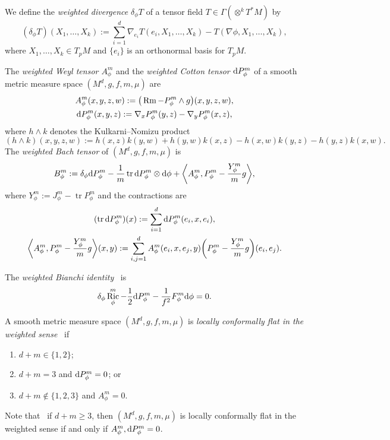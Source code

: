 \documentclass[10pt,a4paper]{amsart}
\DeclareMathOperator{\tr}{tr}
\DeclareMathOperator{\Ric}{Ric}
\DeclareMathOperator{\Rm}{Rm}
\newcommand{\lp}{\langle}
\newcommand{\rp}{\rangle}
\newcommand{\del}{\delta_{\phi}}
\newcommand{\ric}{\Ric_{\phi}^m}
\numberwithin{equation}{section}
\begin{document}
We define the \emph{weighted divergence} $\delta_\phi T$ of a tensor field $T \in \Gamma(\otimes^k T^*M)$ by
\[
(\delta_\phi T)(X_1,\dots,X_k):=\sum\limits_{i=1}^d \nabla_{e_i} T(e_i,X_1,\dots,X_k)-T(\nabla\phi,X_1,\dots,X_k),
\]
where $X_1,\dots,X_k\in T_p M$ and $\{e_i\}$ is an orthonormal basis for $T_p M$.

The \emph{weighted Weyl tensor $A_\phi^m$} and the \emph{weighted Cotton tensor ${\rm d}P_\phi^m$} of a smooth metric measure space $(M^d,g,f,m,\mu)$ are
\begin{gather*}
 A_\phi^m(x,y,z,w) := \big(\Rm - P_\phi^m \wedge g\big)(x,y,z,w) ,
 \\
 {\rm d}P_\phi^m(x,y,z) := \nabla_x P_\phi^m(y,z) - \nabla_y P_\phi^m(x,z) ,
\end{gather*}
where $h\wedge k$ denotes the Kulkarni--Nomizu product
\[
(h\wedge k)(x,y,z,w) := h(x,z)k(y,w) + h(y,w)k(x,z) - h(x,w)k(y,z) - h(y,z)k(x,w) .
\]
The \emph{weighted Bach tensor} of $(M^d,g,f,m,\mu)$ is
\[
B_\phi^m := \delta_\phi {\rm d}P_\phi^m - \frac{1}{m}\tr {\rm d}P_\phi^m \otimes {\rm d}\phi + \biggl\lp A_\phi^m, P_\phi^m - \frac{Y_\phi^m}{m}g\biggr\rp ,
\]
where $Y_\phi^m := J_\phi^m - \tr P_\phi^m$ and the contractions are
\begin{gather*}
 (\tr {\rm d}P_\phi^m)(x) := \sum_{i=1}^d {\rm d}P_\phi^m(e_i,x,e_i),
 \\
 \biggl\lp A_\phi^m, P_\phi^m - \frac{Y_\phi^m}{m}g\biggr\rp(x,y) := \sum_{i,j=1}^d A_\phi^m(e_i,x,e_j,y)\biggl(P_\phi^m - \frac{Y_\phi^m}{m}g\biggr)(e_i,e_j).
\end{gather*}

The \emph{weighted Bianchi identity}~\cite{Case2014sd} is
\begin{equation}
\label{intro-weighted-bianchi}
 \del \ric-\frac{1}{2}{\rm d}P_\phi^m-\frac{1}{f^2} F_\phi^m {\rm d}\phi=0.
\end{equation}

{\samepage
A smooth metric measure space $(M^d,g,f,m,\mu)$ is \emph{locally conformally flat in the weighted sense}~\cite{Case2014s} if
\begin{enumerate}[label=$(\roman*)$]\itemsep=0pt
 \item $d+m\in\{1,2\}$;
 \item $d+m=3$ and ${\rm d}P_\phi^m=0$; or
 \item $d+m\not\in\{1,2,3\}$ and $A_\phi^m=0$.
\end{enumerate}

}

Note that~\cite{Case2014s} if $d+m\geq 3$, then $(M^d,g,f,m,\mu)$ is locally conformally flat in the weighted sense if and only if $A_\phi^m,{\rm d}P_\phi^m=0$.
\end{document}
